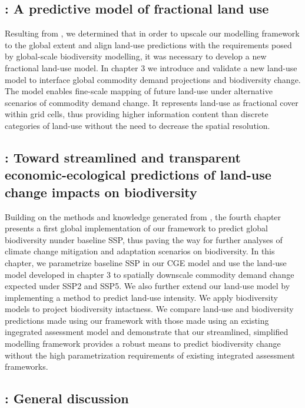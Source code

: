 \subsection*{: A predictive model of fractional land use}
Resulting from , we determined that in order to upscale our modelling framework to the global extent and align land-use predictions with the requirements posed by global-scale biodiversity modelling, it was necessary to develop a new fractional land-use model. In chapter 3 we introduce and validate a new land-use model to interface global commodity demand projections and biodiversity change. The model enables fine-scale mapping of future land-use under alternative scenarios of commodity demand change. It represents land-use as fractional cover within grid cells, thus providing higher information content than discrete categories of land-use without the need to decrease the spatial resolution.

\subsection*{: Toward streamlined and transparent economic-ecological predictions of land-use change impacts on biodiversity}

Building on the methods and knowledge generated from , the fourth chapter presents a first global implementation of our framework to predict global biodiversity nunder baseline SSP, thus paving the way for further analyses of climate change mitigation and adaptation scenarios on biodiversity. In this chapter, we parametrize baseline SSP in our CGE model and use the land-use model developed in chapter 3 to spatially downscale commodity demand change expected under SSP2 and SSP5. We also further extend our land-use model by implementing a method to predict land-use intensity. We apply biodiversity models to project biodiversity intactness. We compare land-use and biodiversity predictions made using our framework with those made using an existing ingegrated assessment model and demonstrate that our streamlined, simplified modelling framework provides a robust means to predict biodiversity change without the high parametrization requirements of existing integrated assessment frameworks.

\subsection*{: General discussion}

